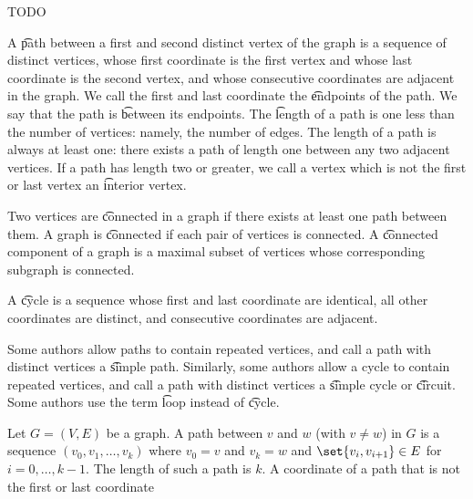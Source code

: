 

TODO


A \t{path} between a first and second distinct vertex of the graph is a sequence of distinct vertices, whose first coordinate is the first vertex and whose last coordinate is the second vertex, and whose consecutive coordinates are adjacent in the graph.
We call the first and last coordinate the \t{endpoints} of the path.
We say that the path is \t{between} its endpoints.
The \t{length} of a path is one less than the number of vertices: namely, the number of edges.
The length of a path is always at least one: there exists a path of length one between any two adjacent vertices.
If a path has length two or greater, we call a vertex which is not the first or last vertex an \t{interior vertex}.

Two vertices are \t{connected} in a graph if there exists at least one path between them.
A graph is \t{connected} if each pair of vertices is connected.
A \t{connected component} of a graph is a maximal subset of vertices whose corresponding subgraph is connected.

A \t{cycle} is a sequence whose first and last coordinate are identical, all other coordinates are distinct, and consecutive coordinates are adjacent.


Some authors allow paths to contain repeated vertices, and call a path with distinct vertices a \t{simple path}.
Similarly, some authors allow a cycle to contain repeated vertices, and call a path with distinct vertices a \t{simple cycle} or \t{circuit}.
Some authors use the term \t{loop} instead of \t{cycle}.


Let $G = (V, E)$ be a graph.
A path between $v$ and $w$ (with $v \neq w$) in $G$ is a sequence $(v_0, v_1, \dots, v_k)$ where $v_0 = v$ and $v_k = w$ and $\set{v_i, v_{i+1}} \in E$ for $i = 0, \dots, k-1$.
The length of such a path is $k$.
A coordinate of a path that is not the first or last coordinate
